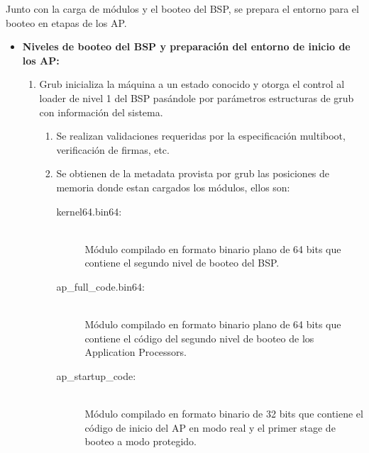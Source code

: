 	Junto con la carga de módulos y el booteo del BSP, se prepara el entorno para el booteo en etapas de los AP.\\
	\begin{itemize}
		\item \textbf{Niveles de booteo del BSP y preparación del entorno de inicio de los AP:} 
			\begin{enumerate}
				\item Grub inicializa la máquina a un estado conocido y otorga el control al loader de nivel 1 del BSP pasándole por parámetros estructuras de grub con información del sistema.
				\begin{enumerate}
					\item Se realizan validaciones requeridas por la especificación multiboot, verificación de firmas, etc.
					
					\item Se obtienen de la metadata provista por grub las posiciones de memoria donde estan cargados los módulos, ellos son:
					\vspace{0.1cm}
					\begin{description}
						\item [kernel64.bin64:] \hfill \\
							Módulo compilado en formato binario plano de 64 bits que contiene el segundo nivel de booteo del BSP.
						\item [ap\_full\_code.bin64:] \hfill \\
							Módulo compilado en formato binario plano de 64 bits que contiene el código del segundo nivel de booteo de los Application Processors.
						\item [ap\_startup\_code:] \hfill \\
							Módulo compilado en formato binario de 32 bits que contiene el código de inicio del AP en modo real y el primer stage de booteo a modo protegido.
					\end{description}
					\vspace{0.5cm}
					

\end{enumerate}
\end{enumerate}
\end{itemize}
